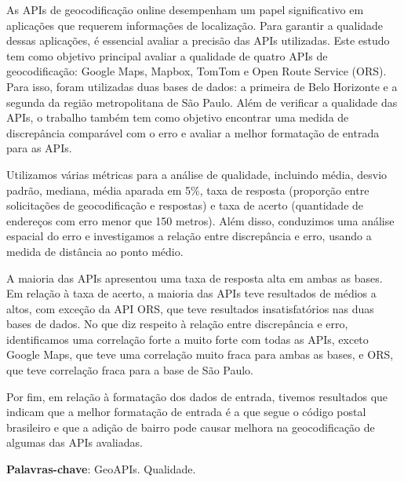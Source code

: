 
\setlength{\absparsep}{18pt} %
\begin{resumo}

  As APIs de geocodificação online desempenham um papel significativo em aplicações que requerem informações de localização. Para garantir a qualidade dessas aplicações, é essencial avaliar a precisão das APIs utilizadas. Este estudo tem como objetivo principal avaliar a qualidade de quatro APIs de geocodificação: Google Maps, Mapbox, TomTom e Open Route Service (ORS). Para isso, foram utilizadas duas bases de dados: a primeira de Belo Horizonte e a segunda da região metropolitana de São Paulo. Além de verificar a qualidade das APIs, o trabalho também tem como objetivo encontrar uma medida de discrepância comparável com o erro e avaliar a melhor formatação de entrada para as APIs.

  Utilizamos várias métricas para a análise de qualidade, incluindo média, desvio padrão, mediana, média aparada em 5\%, taxa de resposta (proporção entre solicitações de geocodificação e respostas) e taxa de acerto (quantidade de endereços com erro menor que 150 metros). Além disso, conduzimos uma análise espacial do erro e investigamos a relação entre discrepância e erro, usando a medida de distância ao ponto médio.
  
  A maioria das APIs apresentou uma taxa de resposta alta em ambas as bases. Em relação à taxa de acerto, a maioria das APIs teve resultados de médios a altos, com exceção da API ORS, que teve resultados insatisfatórios nas duas bases de dados. No que diz respeito à relação entre discrepância e erro, identificamos uma correlação forte a muito forte com todas as APIs, exceto Google Maps, que teve uma correlação muito fraca para ambas as bases, e ORS, que teve correlação fraca para a base de São Paulo.
  
  Por fim, em relação à formatação dos dados de entrada, tivemos resultados que indicam que a melhor formatação de entrada é a que segue o código postal brasileiro e que a adição de bairro pode causar melhora na geocodificação de algumas das APIs avaliadas.
  

 \vspace{\onelineskip}
 \noindent
 \textbf{Palavras-chave}: GeoAPIs. Qualidade. 

\end{resumo}

